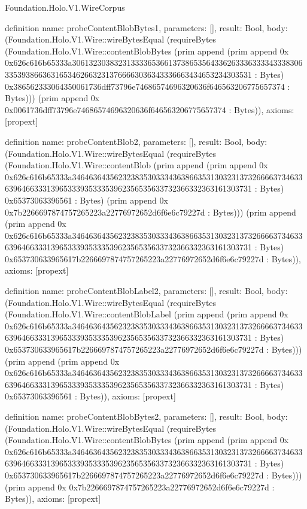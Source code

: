 \begin{lexlean}{Foundation.Holo.V1.WireCorpus}
\begin{semanticmodule}
definition{
  name: probeContentBlobBytes1,
  parameters: [],
  result: Bool,
  body: (Foundation.Holo.V1.Wire::wireBytesEqual (requireBytes (Foundation.Holo.V1.Wire::contentBlobBytes (prim append (prim append 0x 0x626c616b65333a306132303832313333653661373865356433626333633334333830633539386636316534626632313766663036343336663434653234303531 : Bytes) 0x386562333064350061736dff73796e74686574696320636f646563206775657374 : Bytes))) (prim append 0x 0x0061736dff73796e74686574696320636f646563206775657374 : Bytes)),
  axioms: [propext]
}

definition{
  name: probeContentBlob2,
  parameters: [],
  result: Bool,
  body: (Foundation.Holo.V1.Wire::wireBytesEqual (requireBytes (Foundation.Holo.V1.Wire::contentBlob (prim append (prim append 0x 0x626c616b65333a346463643562323835303334363866353130323137326666373463363964663331396533393533353962356535633732366332363161303731 : Bytes) 0x65373063396561 : Bytes) (prim append 0x 0x7b2266697874757265223a22776972652d6f6e6c79227d : Bytes))) (prim append (prim append 0x 0x626c616b65333a346463643562323835303334363866353130323137326666373463363964663331396533393533353962356535633732366332363161303731 : Bytes) 0x653730633965617b2266697874757265223a22776972652d6f6e6c79227d : Bytes)),
  axioms: [propext]
}

definition{
  name: probeContentBlobLabel2,
  parameters: [],
  result: Bool,
  body: (Foundation.Holo.V1.Wire::wireBytesEqual (requireBytes (Foundation.Holo.V1.Wire::contentBlobLabel (prim append (prim append 0x 0x626c616b65333a346463643562323835303334363866353130323137326666373463363964663331396533393533353962356535633732366332363161303731 : Bytes) 0x653730633965617b2266697874757265223a22776972652d6f6e6c79227d : Bytes))) (prim append (prim append 0x 0x626c616b65333a346463643562323835303334363866353130323137326666373463363964663331396533393533353962356535633732366332363161303731 : Bytes) 0x65373063396561 : Bytes)),
  axioms: [propext]
}

definition{
  name: probeContentBlobBytes2,
  parameters: [],
  result: Bool,
  body: (Foundation.Holo.V1.Wire::wireBytesEqual (requireBytes (Foundation.Holo.V1.Wire::contentBlobBytes (prim append (prim append 0x 0x626c616b65333a346463643562323835303334363866353130323137326666373463363964663331396533393533353962356535633732366332363161303731 : Bytes) 0x653730633965617b2266697874757265223a22776972652d6f6e6c79227d : Bytes))) (prim append 0x 0x7b2266697874757265223a22776972652d6f6e6c79227d : Bytes)),
  axioms: [propext]
}


\end{semanticmodule}
\end{lexlean}
